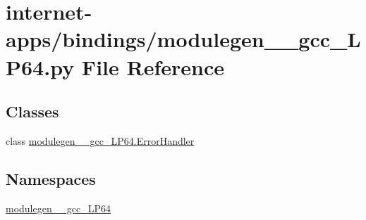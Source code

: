 \hypertarget{internet-apps_2bindings_2modulegen____gcc__LP64_8py}{}\section{internet-\/apps/bindings/modulegen\+\_\+\+\_\+gcc\+\_\+\+L\+P64.py File Reference}
\label{internet-apps_2bindings_2modulegen____gcc__LP64_8py}
\subsection*{Classes}
\begin{DoxyCompactItemize}
\item 
class \hyperlink{classmodulegen____gcc__LP64_1_1ErrorHandler}{modulegen\+\_\+\+\_\+gcc\+\_\+\+L\+P64.\+Error\+Handler}
\end{DoxyCompactItemize}
\subsection*{Namespaces}
\begin{DoxyCompactItemize}
\item 
 \hyperlink{namespacemodulegen____gcc__LP64}{modulegen\+\_\+\+\_\+gcc\+\_\+\+L\+P64}
\end{DoxyCompactItemize}
